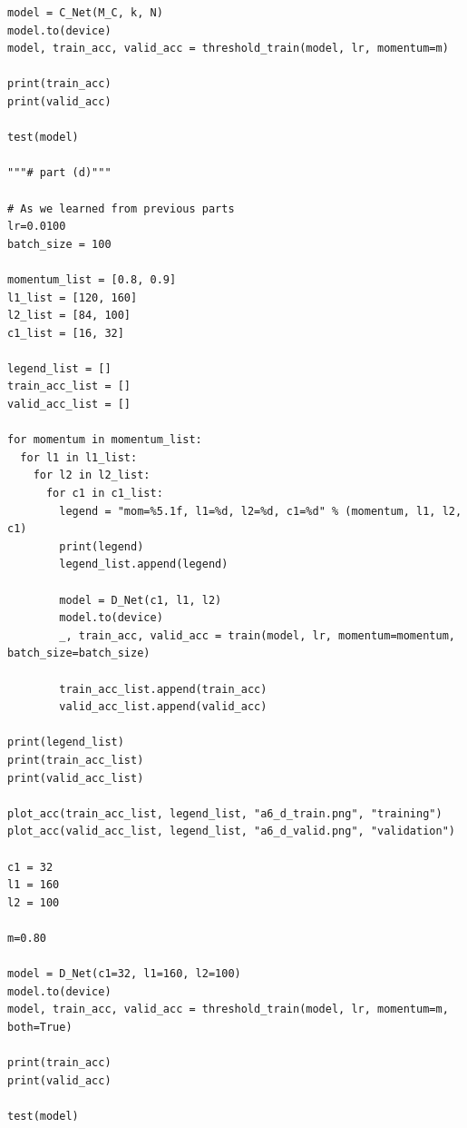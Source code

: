 \documentclass{article}
\newcommand{\1}{\mathbf{1}}
\begin{document}
{\begin{verbatim}
model = C_Net(M_C, k, N)
model.to(device)
model, train_acc, valid_acc = threshold_train(model, lr, momentum=m)

print(train_acc)
print(valid_acc)

test(model)

"""# part (d)"""

# As we learned from previous parts
lr=0.0100
batch_size = 100

momentum_list = [0.8, 0.9]
l1_list = [120, 160]
l2_list = [84, 100]
c1_list = [16, 32]

legend_list = []
train_acc_list = []
valid_acc_list = []

for momentum in momentum_list:
  for l1 in l1_list:
    for l2 in l2_list:
      for c1 in c1_list:
        legend = "mom=%5.1f, l1=%d, l2=%d, c1=%d" % (momentum, l1, l2, c1)
        print(legend)
        legend_list.append(legend)

        model = D_Net(c1, l1, l2)
        model.to(device)
        _, train_acc, valid_acc = train(model, lr, momentum=momentum, batch_size=batch_size)

        train_acc_list.append(train_acc)
        valid_acc_list.append(valid_acc)

print(legend_list)
print(train_acc_list)
print(valid_acc_list)

plot_acc(train_acc_list, legend_list, "a6_d_train.png", "training")
plot_acc(valid_acc_list, legend_list, "a6_d_valid.png", "validation")

c1 = 32
l1 = 160
l2 = 100

m=0.80

model = D_Net(c1=32, l1=160, l2=100)
model.to(device)
model, train_acc, valid_acc = threshold_train(model, lr, momentum=m, both=True)

print(train_acc)
print(valid_acc)

test(model)
\end{verbatim}

}
\end{document}
